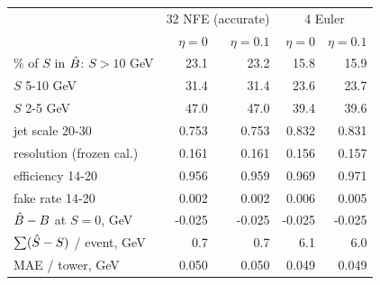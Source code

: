 \scriptsize
\setlength{\tabcolsep}{4pt}
\begin{tabular}{lrrrr}
\toprule
 & \multicolumn{2}{c}{32 NFE (accurate)} & \multicolumn{2}{c}{4 Euler} \\
 & $\eta = 0$ & $\eta = 0.1$ & $\eta = 0$ & $\eta = 0.1$ \\
\midrule
\% of $S$ in $\hat B$: $S > 10$ GeV & 23.1 & 23.2 & 15.8 & 15.9 \\
\hspace{1em}$S$ 5-10 GeV & 31.4 & 31.4 & 23.6 & 23.7 \\
\hspace{1em}$S$ 2-5 GeV & 47.0 & 47.0 & 39.4 & 39.6 \\
jet scale 20-30 & 0.753 & 0.753 & 0.832 & 0.831 \\
resolution (frozen cal.) & 0.161 & 0.161 & 0.156 & 0.157 \\
efficiency 14-20 & 0.956 & 0.959 & 0.969 & 0.971 \\
fake rate 14-20 & 0.002 & 0.002 & 0.006 & 0.005 \\
$\hat B - B$ at $S = 0$, GeV & -0.025 & -0.025 & -0.025 & -0.025 \\
$\sum(\hat S - S)$ / event, GeV & 0.7 & 0.7 & 6.1 & 6.0 \\
MAE / tower, GeV & 0.050 & 0.050 & 0.049 & 0.049 \\
\bottomrule
\end{tabular}
